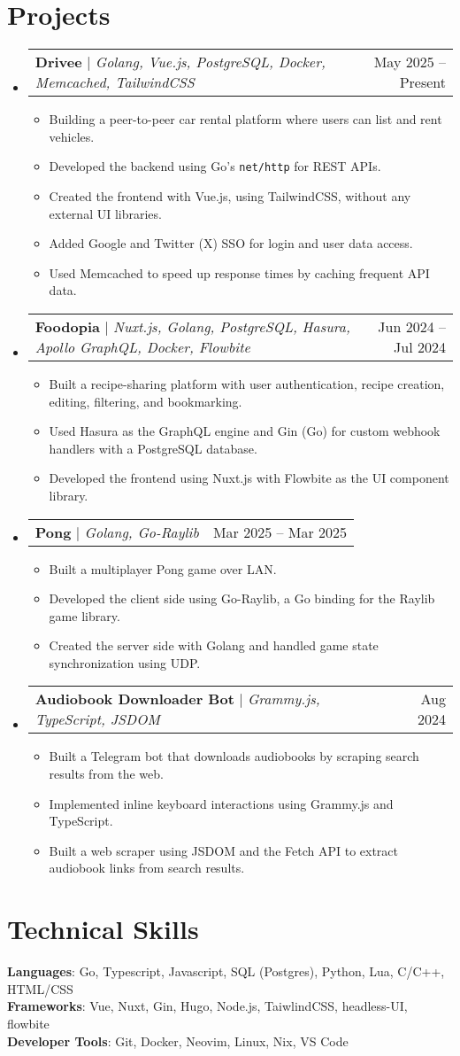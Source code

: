 \documentclass[letterpaper,11pt]{article}
\makeatletter
\newcommand{\resumeItem}[1]{
  \item\small{
    {#1 \vspace{-2pt}}
  }
}
\newcommand{\resumeProjectHeading}[2]{
    \item
    \begin{tabular*}{0.97\textwidth}{l@{\extracolsep{\fill}}r}
      \small#1 & #2 \\
    \end{tabular*}\vspace{-7pt}
}
\newcommand{\resumeSubHeadingListStart}{\begin{itemize}[leftmargin=0.15in, label={}]}
\newcommand{\resumeSubHeadingListEnd}{\end{itemize}}
\newcommand{\resumeItemListStart}{\begin{itemize}}
\newcommand{\resumeItemListEnd}{\end{itemize}\vspace{-5pt}}
\makeatother
\begin{document}
\section{Projects}
    \resumeSubHeadingListStart
      \resumeProjectHeading
          {\textbf{Drivee} $|$ \emph{Golang, Vue.js, PostgreSQL, Docker, Memcached, TailwindCSS}} {May 2025 -- Present}
          \resumeItemListStart
            \resumeItem{Building a peer-to-peer car rental platform where users can list and rent vehicles.}
            \resumeItem{Developed the backend using Go's \texttt{net/http} for REST APIs.}
            \resumeItem{Created the frontend with Vue.js, using TailwindCSS, without any external UI libraries.}
            \resumeItem{Added Google and Twitter (X) SSO for login and user data access.}
            \resumeItem{Used Memcached to speed up response times by caching frequent API data.}
          \resumeItemListEnd
      \resumeProjectHeading
          {\textbf{Foodopia} $|$  \emph{Nuxt.js, Golang, PostgreSQL, Hasura, Apollo GraphQL, Docker, Flowbite}} {Jun 2024 -- Jul 2024}
          \resumeItemListStart
            \resumeItem{Built a recipe-sharing platform with user authentication, recipe creation, editing, filtering, and bookmarking.}
            \resumeItem{Used Hasura as the GraphQL engine and Gin (Go) for custom webhook handlers with a PostgreSQL database.}
            \resumeItem{Developed the frontend using Nuxt.js with Flowbite as the UI component library.}
          \resumeItemListEnd
      \resumeProjectHeading
          {\textbf{Pong} $|$ \emph{Golang, Go-Raylib}} {Mar 2025 -- Mar 2025}
          \resumeItemListStart
            \resumeItem{Built a multiplayer Pong game over LAN.}
            \resumeItem{Developed the client side using Go-Raylib, a Go binding for the Raylib game library.}
            \resumeItem{Created the server side with Golang and handled game state synchronization using UDP.}
          \resumeItemListEnd
      \resumeProjectHeading
          {\textbf{Audiobook Downloader Bot} $|$ \emph{Grammy.js, TypeScript, JSDOM}} {Aug 2024}
          \resumeItemListStart
            \resumeItem{Built a Telegram bot that downloads audiobooks by scraping search results from the web.}
            \resumeItem{Implemented inline keyboard interactions using Grammy.js and TypeScript.}
            \resumeItem{Built a web scraper using JSDOM and the Fetch API to extract audiobook links from search results.}
          \resumeItemListEnd
    \resumeSubHeadingListEnd
%
\section{Technical Skills}
 \begin{itemize}[leftmargin=0.15in, label={}]
    \small{\item{
     \textbf{Languages}{: Go, Typescript, Javascript, SQL (Postgres), Python, Lua, C/C++, HTML/CSS} \\
     \textbf{Frameworks}{: Vue, Nuxt, Gin, Hugo, Node.js, TaiwlindCSS, headless-UI, flowbite} \\
     \textbf{Developer Tools}{: Git, Docker, Neovim, Linux, Nix, VS Code} \\
    }}
 \end{itemize}


\end{document}
